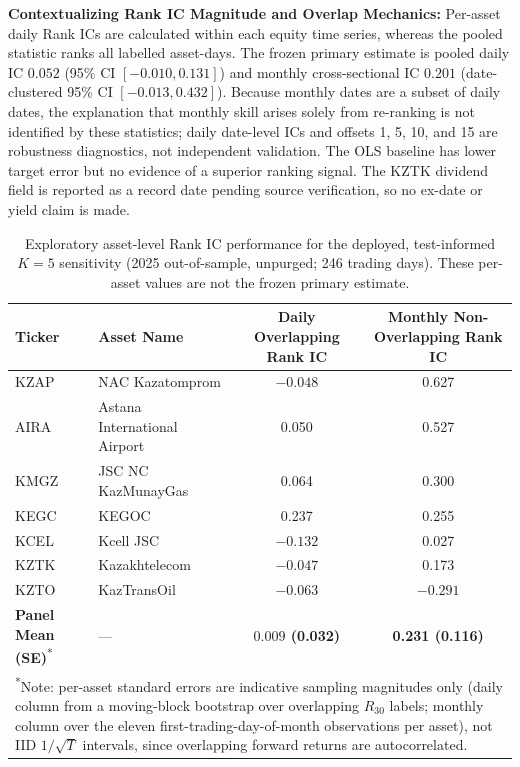 \documentclass[pdflatex,sn-mathphys-num]{sn-jnl}
\theoremstyle{thmstyleone}
\theoremstyle{thmstyletwo}
\theoremstyle{thmstylethree}
\begin{document}
\noindent\textbf{Contextualizing Rank IC Magnitude and Overlap Mechanics:} Per-asset daily Rank ICs are calculated within each equity time series, whereas the pooled statistic ranks all labelled asset-days. The frozen primary estimate is pooled daily IC $0.052$ (95\% CI $[-0.010,0.131]$) and monthly cross-sectional IC $0.201$ (date-clustered 95\% CI $[-0.013,0.432]$). Because monthly dates are a subset of daily dates, the explanation that monthly skill arises solely from re-ranking is not identified by these statistics; daily date-level ICs and offsets 1, 5, 10, and 15 are robustness diagnostics, not independent validation. The OLS baseline has lower target error but no evidence of a superior ranking signal. The KZTK dividend field is reported as a record date pending source verification, so no ex-date or yield claim is made.

\begin{table}[htbp]
\centering
\small
\caption{Exploratory asset-level Rank IC performance for the deployed, test-informed $K=5$ sensitivity (2025 out-of-sample, unpurged; 246 trading days). These per-asset values are not the frozen primary estimate.}
\label{tab:rank_ic_breakdown}
\begin{tabular}{@{}llcc@{}}
\toprule
\textbf{Ticker} & \textbf{Asset Name} & \textbf{Daily Overlapping Rank IC} & \textbf{Monthly Non-Overlapping Rank IC} \\
\midrule
KZAP & NAC Kazatomprom             & $-0.048$ & 0.627 \\
AIRA & Astana International Airport & 0.050 & 0.527 \\
KMGZ & JSC NC KazMunayGas          & 0.064 & 0.300 \\
KEGC & KEGOC                       & 0.237 & 0.255 \\
KCEL & Kcell JSC                   & $-0.132$ & 0.027 \\
KZTK & Kazakhtelecom               & $-0.047$ & 0.173 \\
KZTO & KazTransOil                 & $-0.063$ & $-0.291$ \\
\midrule
\textbf{Panel Mean (SE)}\textsuperscript{*} & — & \textbf{$0.009$ (0.032)} & \textbf{0.231 (0.116)} \\
\bottomrule
\multicolumn{4}{p{0.92\textwidth}}{\footnotesize \textsuperscript{*}Note: per-asset standard errors are indicative sampling magnitudes only (daily column from a moving-block bootstrap over overlapping $R_{30}$ labels; monthly column over the eleven first-trading-day-of-month observations per asset), not IID $1/\sqrt{T}$ intervals, since overlapping forward returns are autocorrelated.}
\end{tabular}
\end{table}
\end{document}
